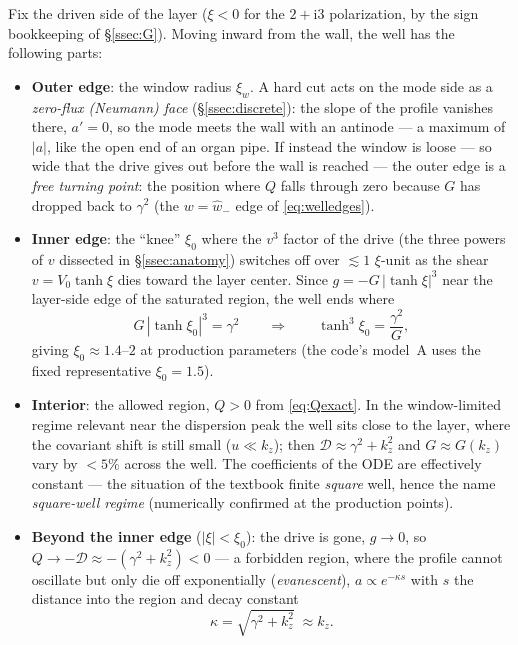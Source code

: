 \documentclass[11pt,a4paper]{article}
\numberwithin{equation}{section}
\theoremstyle{remark}
\newcommand{\Vo}{V_0}
\newcommand{\kz}{k_z}
\newcommand{\D}{\mathcal{D}}
\newcommand{\ii}{\mathrm{i}}
\begin{document}
Fix the driven side of the layer ($\xi<0$ for the $2+\ii3$
polarization, by the sign bookkeeping of \S\ref{ssec:G}). Moving inward
from the wall, the well has the following parts:
\begin{itemize}
\item \textbf{Outer edge}: the window radius $\xi_w$. A hard cut acts
on the mode side as a \emph{zero-flux (Neumann) face}
(\S\ref{ssec:discrete}): the slope of the profile vanishes there,
$a'=0$, so the mode meets the wall with an antinode --- a maximum of
$|a|$, like the open end of an organ pipe. If instead the window is
loose --- so wide that the drive gives out before the wall is reached
--- the outer edge is a \emph{free turning point}: the position where
$Q$ falls through zero because $G$ has dropped back to $\gamma^2$ (the
$w=\hat w_-$ edge of \eqref{eq:welledges}).
\item \textbf{Inner edge}: the ``knee'' $\xi_0$ where the $v^3$ factor
of the drive (the three powers of $v$ dissected in
\S\ref{ssec:anatomy}) switches off over $\lesssim1$ $\xi$-unit as the
shear $v=\Vo\tanh\xi$ dies toward the layer center. Since
$g=-G\,|\tanh\xi|^3$ near the layer-side edge of the saturated region, the
well ends where
\begin{equation}
G\,|\tanh\xi_0|^3=\gamma^2
\qquad\Longrightarrow\qquad
\tanh^3\xi_0=\frac{\gamma^2}{G},
\label{eq:knee}
\end{equation}
giving $\xi_0\approx1.4$--$2$ at production parameters (the code's model~A
uses the fixed representative $\xi_0=1.5$).
\item \textbf{Interior}: the allowed region, $Q>0$ from
\eqref{eq:Qexact}. In the window-limited regime relevant near the
dispersion peak the well sits close to the layer, where the covariant
shift is still small ($u\ll\kz$); then $\D\approx\gamma^2+\kz^2$ and
$G\approx G(\kz)$ vary by $<5\%$ across the well. The coefficients of
the ODE are effectively constant --- the situation of the textbook
finite \emph{square} well, hence the name \emph{square-well regime}
(numerically confirmed at the production points).
\item \textbf{Beyond the inner edge} ($|\xi|<\xi_0$): the drive is
gone, $g\to0$, so $Q\to-\D\approx-(\gamma^2+\kz^2)<0$ --- a forbidden
region, where the profile cannot oscillate but only die off
exponentially (\emph{evanescent}), $a\propto e^{-\kappa s}$ with $s$
the distance into the region and decay constant
\begin{equation}
\kappa=\sqrt{\gamma^2+\kz^2}\;\approx\kz .
\label{eq:kappa}
\end{equation}
\end{itemize}
\end{document}
